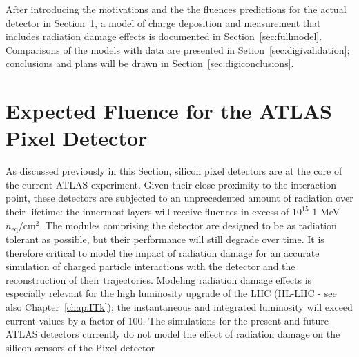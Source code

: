  
After introducing the motivations and the the fluences predictions for the actual detector in 
Section~\ref{sec:expflu}, a model of charge deposition and measurement that includes radiation 
damage effects is documented in Section~\ref{sec:fullmodel}. Comparisons of the models with data are 
presented in Setion~\ref{sec:digivalidation}; conclusions and plans will be drawn in Section~\ref{sec:digiconclusions}.


\section{Expected Fluence for the ATLAS Pixel Detector}
\label{sec:expflu}
As discussed previously in this Section, silicon pixel detectors are at 
the core of the current ATLAS  experiment.  Given their close proximity to the interaction point, these 
detectors are subjected to an 
unprecedented amount of radiation over their lifetime:  the innermost layers will receive 
fluences in excess of $10^{15}$ 1 MeV $n_\text{eq}/\text{cm}^2$. The modules comprising the detector are designed to be as radiation tolerant as possible, but their performance will still degrade over time.  It is therefore critical to model the impact of radiation damage for an accurate simulation of charged particle interactions with the detector and the reconstruction of their trajectories.  Modeling radiation damage effects is especially relevant for the high luminosity upgrade of the LHC (HL-LHC - see also Chapter~\ref{chap:ITk}); the instantaneous and integrated luminosity will exceed current values by a factor of 100.  The simulations for the present and future ATLAS detectors currently do not model the effect of radiation damage on the silicon sensors of the Pixel detector~\cite{Aad:2010ah,ATL-PHYS-PUB-2016-025}

